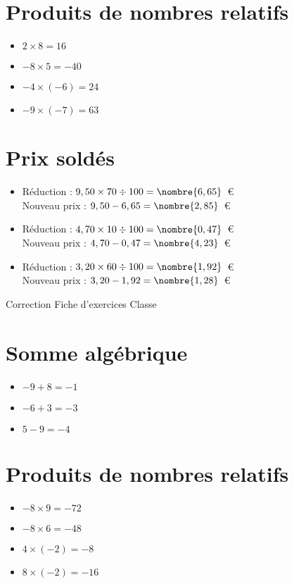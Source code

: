 \documentclass[a4paper,11pt,fleqn]{article}
\begin{document}
\section{Produits de nombres relatifs}
\begin{itemize}

  \item $2\times8=16$
  \item $-8\times5=-40$
  \item $-4\times(-6)=24$
  \item $-9\times(-7)=63$
\end{itemize}

\section{Prix soldés}
\begin{itemize}

  \item Réduction : $9,50\times70\div100=\nombre{6,65}$~€\\
  Nouveau prix : $9,50-6,65=\nombre{2,85}$~€
  \item Réduction : $4,70\times10\div100=\nombre{0,47}$~€\\
  Nouveau prix : $4,70-0,47=\nombre{4,23}$~€
  \item Réduction : $3,20\times60\div100=\nombre{1,92}$~€\\
  Nouveau prix : $3,20-1,92=\nombre{1,28}$~€
\end{itemize}
\newpage
\setcounter{exo}{0}
\setcounter{section}{0}
{Correction} \hfill {\huge Fiche d'exercices } \hfill {Classe}

\section{Somme algébrique}
\begin{itemize}

  \item $-9 +8=-1$
  \item $-6 +3=-3$
  \item $5 -9=-4$
\end{itemize}

\section{Produits de nombres relatifs}
\begin{itemize}

  \item $-8\times9=-72$
  \item $-8\times6=-48$
  \item $4\times(-2)=-8$
  \item $8\times(-2)=-16$
\end{itemize}
\end{document}
